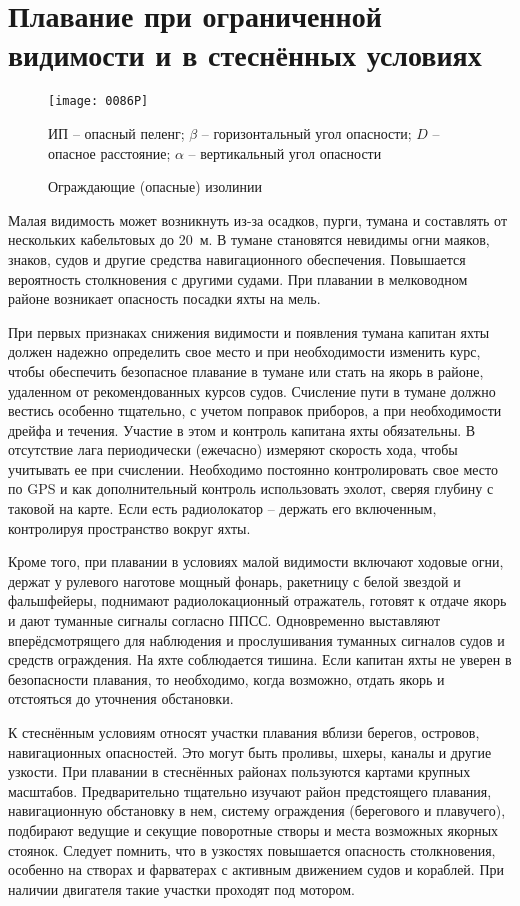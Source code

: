 \section{Плавание при ограниченной видимости и в стеснённых условиях}

\begin{figure*}[htb]
  \centering{}
  \texttt{[image: 0086P]}
  \caption{Ограждающие (опасные) изолинии}
  \label{fig:N86}
  \small
  \centering{}
  ИП \--- опасный пеленг; $\beta$ \--- горизонтальный угол опасности; $D$ \--- опасное расстояние; $\alpha$ \--- вертикальный угол опасности
\end{figure*}

Малая видимость может возникнуть из-за осадков, пурги, тумана и
составлять от нескольких кабельтовых до 20~м. В тумане
становятся невидимы огни маяков, знаков, судов и другие средства
навигационного обеспечения. Повышается вероятность столкновения с
другими судами. При плавании в мелководном районе возникает опасность
посадки яхты на мель.
 
При первых признаках снижения видимости и появления тумана капитан
яхты должен надежно определить свое место и при необходимости изменить
курс, чтобы обеспечить безопасное плавание в тумане или стать на якорь
в районе, удаленном от рекомендованных курсов судов. Счисление пути в
тумане должно вестись особенно тщательно, с учетом поправок приборов,
а при необходимости дрейфа и течения. Участие в этом и контроль
капитана яхты обязательны. В отсутствие лага периодически (ежечасно)
измеряют скорость хода, чтобы учитывать ее при счислении. Необходимо
постоянно контролировать свое место по GPS и как дополнительный
контроль использовать эхолот, сверяя глубину с таковой на карте. Если
есть радиолокатор \--- держать его включенным, контролируя
пространство вокруг яхты.
 
Кроме того, при плавании в условиях малой видимости включают ходовые
огни, держат у рулевого наготове мощный фонарь, ракетницу с белой
звездой и фальшфейеры, поднимают радиолокационный отражатель, готовят
к отдаче якорь и дают туманные сигналы согласно ППСС. Одновременно
выставляют вперёдсмотрящего для наблюдения и прослушивания туманных
сигналов судов и средств ограждения. На яхте соблюдается тишина. Если
капитан яхты не уверен в безопасности плавания, то необходимо, когда
возможно, отдать якорь и отстояться до уточнения обстановки.
 
К стеснённым условиям относят участки плавания вблизи берегов,
островов, навигационных опасностей. Это могут быть проливы, шхеры,
каналы и другие узкости. При плавании в стеснённых районах пользуются
картами крупных масштабов. Предварительно тщательно изучают район
предстоящего плавания, навигационную обстановку в нем, систему
ограждения (берегового и плавучего), подбирают ведущие и секущие
поворотные створы и места возможных якорных стоянок. Следует помнить,
что в узкостях повышается опасность столкновения, особенно на створах
и фарватерах с активным движением судов и кораблей. При наличии
двигателя такие участки проходят под мотором.

